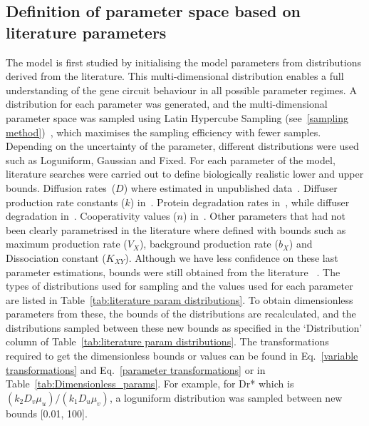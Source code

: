 \subsection{Definition of parameter space based on literature parameters}\label{Definition of parameter space based on literature parametrisation}
The model is first studied by initialising the model parameters from distributions derived from the literature.
This multi-dimensional distribution enables a full understanding of the gene circuit behaviour in all possible parameter regimes.
A distribution for each parameter was generated,
and the multi-dimensional parameter space was sampled using Latin Hypercube Sampling
(see~\ref{sampling method})~\parencite{Iman2014, Bergstra2012},
which maximises the sampling efficiency with fewer samples.
Depending on the uncertainty of the parameter, different distributions were used such as Loguniform, Gaussian and Fixed.
 For each parameter of the model,
literature searches were carried out to define biologically realistic lower and upper bounds.
Diffusion rates~($D$) where estimated in unpublished data~\parencite{tica_diffusers}.
Diffuser production rate constants ($k$) in~\cite{Schaefer1996, Pai2009}.
Protein degradation rates in~\cite{Andersen1998}, while diffuser degradation in~\cite{kaufmann2005revisiting}.
Cooperativity values ($n$) in~\cite{Babic2007}.
Other parameters
that had not been clearly parametrised in the literature where defined with bounds such as maximum production rate
($V_{X}$),
background production rate ($b_{X}$) and Dissociation constant
($K_{XY}$).
Although we have less confidence on these last parameter estimations,
bounds were still obtained from the literature ~\parencite{Scholes2019, Pusnik2019}.
The types of distributions
used for sampling and the values used for each parameter are listed in Table~\ref{tab:literature param distributions}.
To obtain dimensionless parameters from these, the bounds of the distributions are recalculated,
and the distributions sampled between these new bounds as specified in the ‘Distribution’
column of Table~\ref{tab:literature param distributions}.
The transformations
required to get the dimensionless bounds or values can be found in Eq.~\ref{variable transformations} and Eq.~\ref{parameter transformations} or in Table~\ref{tab:Dimensionless_params}.
For example, for Dr* which is $(k_{2}D_{v}\mu_{u})/(k_{1}D_{u}\mu_{v})$,
a loguniform distribution was sampled between new bounds [0.01, 100].
